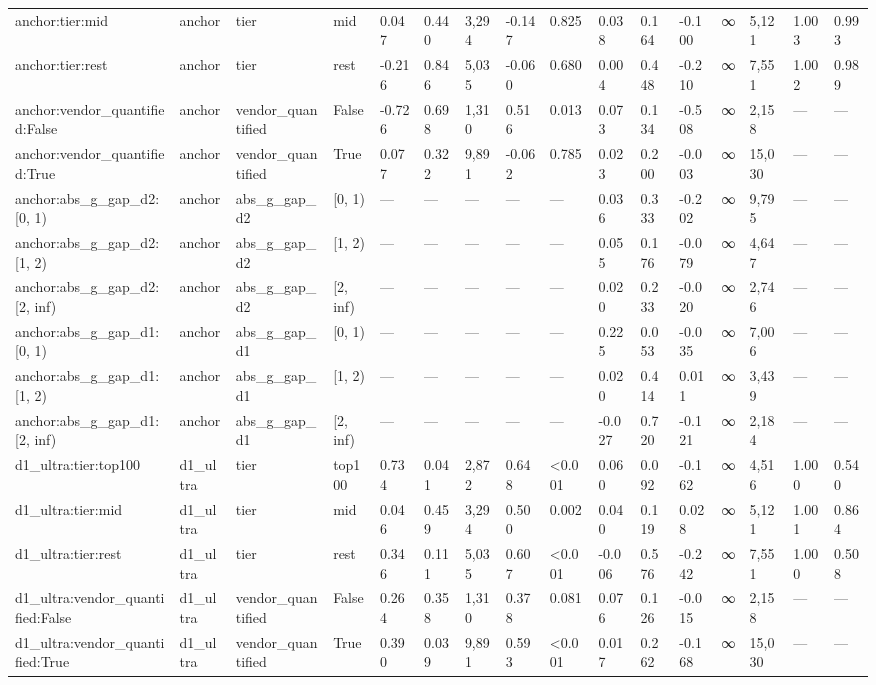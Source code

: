 \begin{tabular}{llllllllllllllll}
anchor:tier:mid & anchor & tier & mid & 0.047 & 0.440 & 3,294 & -0.147 & 0.825 & 0.038 & 0.164 & -0.100 & ∞ & 5,121 & 1.003 & 0.993 \\
anchor:tier:rest & anchor & tier & rest & -0.216 & 0.846 & 5,035 & -0.060 & 0.680 & 0.004 & 0.448 & -0.210 & ∞ & 7,551 & 1.002 & 0.989 \\
anchor:vendor\_quantified:False & anchor & vendor\_quantified & False & -0.726 & 0.698 & 1,310 & 0.516 & 0.013 & 0.073 & 0.134 & -0.508 & ∞ & 2,158 & — & — \\
anchor:vendor\_quantified:True & anchor & vendor\_quantified & True & 0.077 & 0.322 & 9,891 & -0.062 & 0.785 & 0.023 & 0.200 & -0.003 & ∞ & 15,030 & — & — \\
anchor:abs\_g\_gap\_d2:[0, 1) & anchor & abs\_g\_gap\_d2 & [0, 1) & — & — & — & — & — & 0.036 & 0.333 & -0.202 & ∞ & 9,795 & — & — \\
anchor:abs\_g\_gap\_d2:[1, 2) & anchor & abs\_g\_gap\_d2 & [1, 2) & — & — & — & — & — & 0.055 & 0.176 & -0.079 & ∞ & 4,647 & — & — \\
anchor:abs\_g\_gap\_d2:[2, inf) & anchor & abs\_g\_gap\_d2 & [2, inf) & — & — & — & — & — & 0.020 & 0.233 & -0.020 & ∞ & 2,746 & — & — \\
anchor:abs\_g\_gap\_d1:[0, 1) & anchor & abs\_g\_gap\_d1 & [0, 1) & — & — & — & — & — & 0.225 & 0.053 & -0.035 & ∞ & 7,006 & — & — \\
anchor:abs\_g\_gap\_d1:[1, 2) & anchor & abs\_g\_gap\_d1 & [1, 2) & — & — & — & — & — & 0.020 & 0.414 & 0.011 & ∞ & 3,439 & — & — \\
anchor:abs\_g\_gap\_d1:[2, inf) & anchor & abs\_g\_gap\_d1 & [2, inf) & — & — & — & — & — & -0.027 & 0.720 & -0.121 & ∞ & 2,184 & — & — \\
d1\_ultra:tier:top100 & d1\_ultra & tier & top100 & 0.734 & 0.041 & 2,872 & 0.648 & <0.001 & 0.060 & 0.092 & -0.162 & ∞ & 4,516 & 1.000 & 0.540 \\
d1\_ultra:tier:mid & d1\_ultra & tier & mid & 0.046 & 0.459 & 3,294 & 0.500 & 0.002 & 0.040 & 0.119 & 0.028 & ∞ & 5,121 & 1.001 & 0.864 \\
d1\_ultra:tier:rest & d1\_ultra & tier & rest & 0.346 & 0.111 & 5,035 & 0.607 & <0.001 & -0.006 & 0.576 & -0.242 & ∞ & 7,551 & 1.000 & 0.508 \\
d1\_ultra:vendor\_quantified:False & d1\_ultra & vendor\_quantified & False & 0.264 & 0.358 & 1,310 & 0.378 & 0.081 & 0.076 & 0.126 & -0.015 & ∞ & 2,158 & — & — \\
d1\_ultra:vendor\_quantified:True & d1\_ultra & vendor\_quantified & True & 0.390 & 0.039 & 9,891 & 0.593 & <0.001 & 0.017 & 0.262 & -0.168 & ∞ & 15,030 & — & — \\

\end{tabular}
